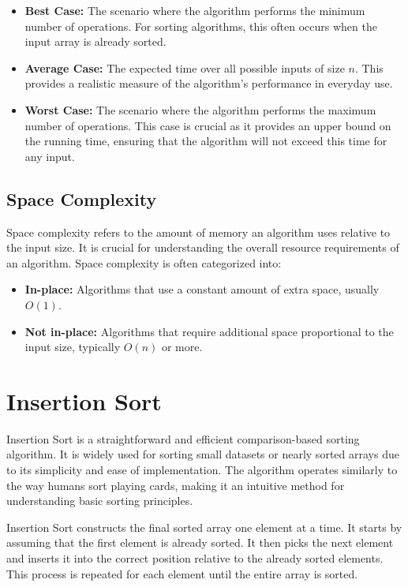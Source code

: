 \documentclass[sigplan,screen]{acmart}
\begin{document}
  \begin{itemize}
      \item \textbf{Best Case:} The scenario where the algorithm performs 
      the minimum number of operations. For sorting algorithms, this often 
      occurs when the input array is already sorted.
      \item \textbf{Average Case:} The expected time over all possible 
      inputs of size $n$. This provides a realistic measure of the 
      algorithm's performance in everyday use.
      \item \textbf{Worst Case:} The scenario where the algorithm performs 
      the maximum number of operations. This case is crucial as it provides
      an upper bound on the running time, ensuring that the algorithm will
      not exceed this time for any input.
  \end{itemize}
  
  \subsection{Space Complexity}
  
  Space complexity refers to the amount of memory an algorithm uses 
  relative to the input size. It is crucial for understanding the overall 
  resource requirements of an algorithm. Space complexity is often 
  categorized into:
  
  \begin{itemize}
      \item \textbf{In-place:} Algorithms that use a constant amount of 
      extra space, usually $O(1)$.
      \item \textbf{Not in-place:} Algorithms that require additional 
      space proportional to the input size, typically $O(n)$ or more.
  \end{itemize}


\section{Insertion Sort}
Insertion Sort is a straightforward and efficient comparison-based sorting 
algorithm. It is widely used for sorting small datasets or nearly sorted 
arrays due to its simplicity and ease of implementation. The algorithm 
operates similarly to the way humans sort playing cards, making it an 
intuitive method for understanding basic sorting principles.

Insertion Sort constructs the final sorted array one element at a time. 
It starts by assuming that the first element is already sorted. It then 
picks the next element and inserts it into the correct position relative 
to the already sorted elements. This process is repeated for each element 
until the entire array is sorted.
\end{document}
